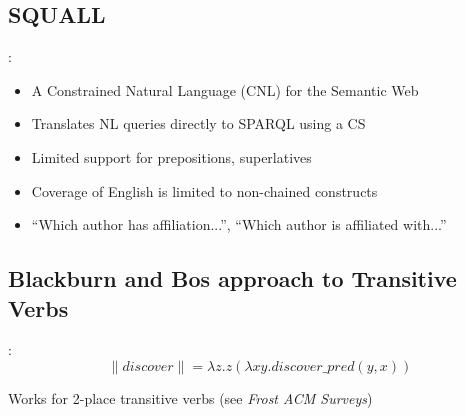 \documentclass[logoontitle,tabu,supertabular,aspectratio=43]{preney-uwindsor-beamer}
\newcommand{\meaningof}[1]{\lVert #1 \rVert}
\newcommand{\wordpred}[1]{\mathit{#1\_pred}}
\newcommand{\discover}{\mathit{discover}}
\begin{document}
    \subsection{SQUALL}
    \begin{frame}{\insertsection: \insertsubsection}
        \begin{itemize}
            \item A Constrained Natural Language (CNL) for the Semantic Web
            \item Translates NL queries directly to SPARQL using a CS
            \item Limited support for prepositions, superlatives
            \item Coverage of English is limited to non-chained constructs
            \item ``Which author has affiliation...'', ``Which author is affiliated with...''
        \end{itemize}
    \end{frame}

    \subsection{Blackburn and Bos approach to Transitive Verbs}
    \begin{frame}{\insertsection: \insertsubsection}
        \begin{equation*}
            \meaningof{discover} = \lambda z. z(\lambda xy. \wordpred{\discover}(y, x))
        \end{equation*}

        \centering
        Works for 2-place transitive verbs (see \textit{Frost ACM Surveys}\cite{frost2006realization})
    \end{frame}
\end{document}
